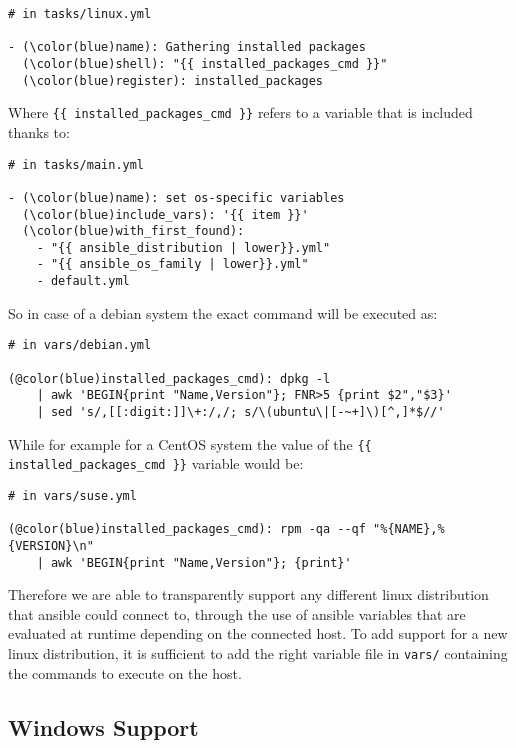 \documentclass[11pt]{article}
\begin{document}
\begin{Verbatim}[commandchars=\\\(\)]
# in tasks/linux.yml

- (\color(blue)name): Gathering installed packages
  (\color(blue)shell): "{{ installed_packages_cmd }}"
  (\color(blue)register): installed_packages
\end{Verbatim}

Where {\tt \{\{ installed\_packages\_cmd \}\}} refers to a variable that is included thanks to:

\begin{Verbatim}[commandchars=\\\(\)]
# in tasks/main.yml

- (\color(blue)name): set os-specific variables
  (\color(blue)include_vars): '{{ item }}'
  (\color(blue)with_first_found):
    - "{{ ansible_distribution | lower}}.yml"
    - "{{ ansible_os_family | lower}}.yml"
    - default.yml
\end{Verbatim}

So in case of a debian system the exact command will be executed as:

\begin{Verbatim}[commandchars=@\(\)]
# in vars/debian.yml

(@color(blue)installed_packages_cmd): dpkg -l 
    | awk 'BEGIN{print "Name,Version"}; FNR>5 {print $2","$3}' 
    | sed 's/,[[:digit:]]\+:/,/; s/\(ubuntu\|[-~+]\)[^,]*$//'
\end{Verbatim}

While for example for a CentOS system the value of the {\tt \{\{ installed\_packages\_cmd \}\}} variable would be:

\begin{Verbatim}[commandchars=@\(\)]
# in vars/suse.yml

(@color(blue)installed_packages_cmd): rpm -qa --qf "%{NAME},%{VERSION}\n" 
    | awk 'BEGIN{print "Name,Version"}; {print}'
\end{Verbatim}

Therefore we are able to transparently support any different linux distribution that ansible could connect to, through the use of ansible variables that are evaluated at runtime depending on the connected host. To add support for a new linux distribution, it is sufficient to add the right variable file in {\tt vars/} containing the commands to execute on the host.

\subsection{Windows Support}
\end{document}
